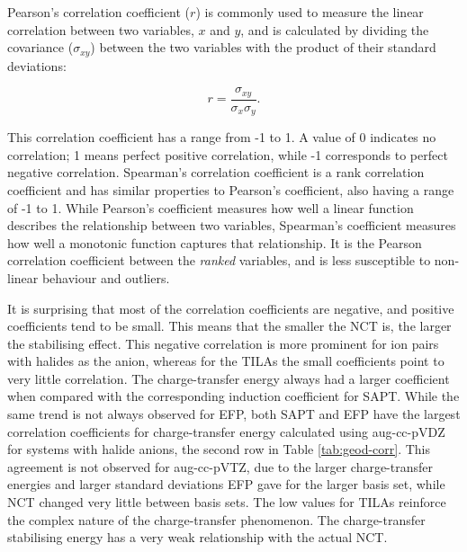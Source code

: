 Pearson's correlation coefficient ($r$) is commonly used to measure the linear correlation between two variables, $x$ and $y$, and is calculated by dividing the covariance ($\sigma_{xy}$) between the two variables with the product of their standard deviations:

\begin{equation}
    r = \frac{\sigma_{xy}}{\sigma_x \sigma_y}.
\end{equation}

This correlation coefficient has a range from -1 to 1.
A value of 0 indicates no correlation; 1 means perfect positive correlation, while -1 corresponds to perfect negative correlation.
Spearman's correlation coefficient is a rank correlation coefficient and has similar properties to Pearson's coefficient, also having a range of -1 to 1. 
While Pearson's coefficient measures how well a linear function describes the relationship between two variables, Spearman's coefficient measures how well a monotonic function captures that relationship.
It is the Pearson correlation coefficient between the \emph{ranked} variables, and is less susceptible to non-linear behaviour and outliers.


It is surprising that most of the correlation coefficients are negative, and positive coefficients tend to be small.
This means that the smaller the NCT is, the larger the stabilising effect.
This negative correlation is more prominent for ion pairs with halides as the anion, whereas for the TILAs the small coefficients point to very little correlation.
The charge-transfer energy always had a larger coefficient when compared with the corresponding induction coefficient for SAPT.
While the same trend is not always observed for EFP, both SAPT and EFP have the largest correlation coefficients for charge-transfer energy calculated using aug-cc-pVDZ for systems with halide anions, the second row in Table \ref{tab:geod-corr}.
This agreement is not observed for aug-cc-pVTZ, due to the larger charge-transfer energies and larger standard deviations EFP gave for the larger basis set, while NCT changed very little between basis sets.
The low values for TILAs reinforce the complex nature of the charge-transfer phenomenon.
The charge-transfer stabilising energy has a very weak relationship with the actual NCT.

